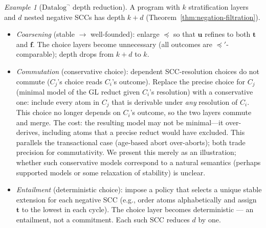 \documentclass[acmsmall,review,anonymous]{acmart}
\newcommand{\Ord}{\preceq}
\theoremstyle{remark}
\newtheorem{example}{Example}
\numberwithin{definition}{section}
\numberwithin{theorem}{section}
\numberwithin{lemma}{section}
\numberwithin{corollary}{section}
\numberwithin{remark}{section}
\numberwithin{example}{section}
\numberwithin{observation}{section}
\numberwithin{assumption}{section}
\begin{document}
\begin{example}[$\mbox{Datalog}^\neg$ depth reduction]
  \label{ex:depth-reduction-datalog}
  A program with $k$ stratification layers and $d$ nested negative
  SCCs has depth $k{+}d$ (Theorem~\ref{thm:negation-filtration}).
  \begin{itemize}[nosep]
    \item \emph{Coarsening} (stable $\to$ well-founded): enlarge
          $\Ord$ so that $\mathbf{u}$ refines to both $\mathbf{t}$ and
          $\mathbf{f}$.
          The choice layers become unnecessary (all outcomes are
          $\Ord'$-comparable); depth drops from $k{+}d$ to $k$.
    \item \emph{Commutation} (conservative choice): dependent
          SCC-resolution choices do not commute ($C_j$'s choice reads
          $C_i$'s outcome).
          Replace the precise choice for $C_j$ (minimal model of the
          GL reduct given $C_i$'s resolution) with a conservative one:
          include every atom in $C_j$ that is derivable under
          \emph{any} resolution of $C_i$.
          This choice no longer depends on $C_i$'s outcome, so the two
          layers commute and merge.
          The cost: the resulting model may not be minimal---it
          over-derives, including atoms that a precise reduct would
          have excluded.
          This parallels the transactional case (age-based abort
          over-aborts); both trade precision for commutativity.
          We present this merely as an illustration; whether such
          conservative models correspond to a natural
          semantics (perhaps supported models or some relaxation of
          stability) is unclear.
    \item \emph{Entailment} (deterministic choice): impose a policy
          that selects a unique stable extension for each negative SCC
          (e.g., order atoms alphabetically and assign $\mathbf{t}$ to
          the lowest in each cycle).
          The choice layer becomes deterministic --- an entailment, not
          a commitment.
          Each such SCC reduces $d$ by one.
  \end{itemize}
\end{example}




\end{document}
